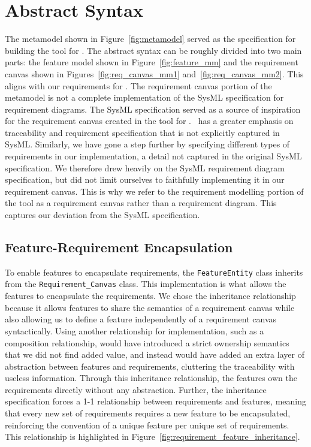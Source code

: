 \section{Abstract Syntax}
\label{sec:Abstract_Syntax}

The metamodel shown in Figure~\ref{fig:metamodel} served as the specification for building the tool for \tool. The abstract syntax can be roughly divided into two main parts: the feature model shown in Figure~\ref{fig:feature_mm} and the requirement canvas shown in Figures~\ref {fig:req_canvas_mm1} and~\ref{fig:req_canvas_mm2}. This aligns with our requirements for \tool. The requirement canvas portion of the metamodel is not a complete implementation of the SysML specification for requirement diagrams. The SysML specification served as a source of inspiration for the requirement canvas created in the tool for \tool. \tool\ has a greater emphasis on traceability and requirement specification that is not explicitly captured in SysML. Similarly, we have gone a step further by specifying different types of requirements in our implementation, a detail not captured in the original SysML specification. We therefore drew heavily on the SysML requirement diagram specification, but did not limit ourselves to faithfully implementing it in our requirement canvas. This is why we refer to the requirement modelling portion of the tool as a requirement canvas rather than a requirement diagram. This captures our deviation from the SysML specification. 

\subsection{Feature-Requirement Encapsulation}
To enable features to encapsulate requirements, the \texttt{FeatureEntity} class inherits from the \texttt{Requirement\_Canvas} class. This implementation is what allows the features to encapsulate the requirements. We chose the inheritance relationship because it allows features to share the semantics of a requirement canvas while also allowing us to define a feature independently of a requirement canvas syntactically. Using another relationship for implementation, such as a composition relationship, would have introduced a strict ownership semantics that we did not find added value, and instead would have added an extra layer of abstraction between features and requirements, cluttering the traceability with useless information. Through this inheritance relationship, the features own the requirements directly without any abstraction. Further, the inheritance specification forces a 1-1 relationship between requirements and features, meaning that every new set of requirements requires a new feature to be encapsulated, reinforcing the convention of a unique feature per unique set of requirements. This relationship is highlighted in Figure~\ref{fig:requirement_feature_inheritance}.

